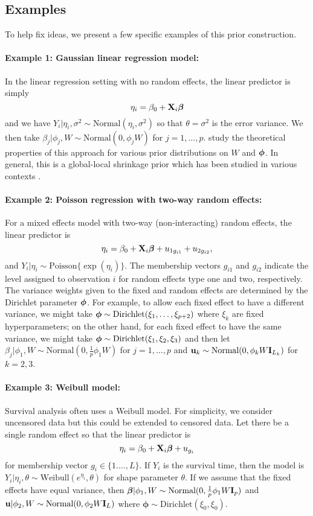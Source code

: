 \documentclass[12pt]{article}
\begin{document}
\subsection{Examples}\label{s:examples}
To help fix ideas, we present a few specific examples of this prior construction.

\paragraph{Example 1: Gaussian linear regression model:} In the linear regression setting with no random effects, the linear predictor is simply $$\eta_i=\beta_0+\mbox{\bf X}_i\mbox{\boldmath $\beta$}$$ and we have $Y_i|\eta_i,\sigma^2\sim\mbox{Normal}(\eta_i,\sigma^2)$ so that $\theta=\sigma^2$ is the error variance. We then take $\beta_j|\phi_j,W\sim\mbox{Normal}(0,\phi_j W)$ for $j=1,\dots,p$. \cite{zhang2022bayesian} study the theoretical properties of this approach for various prior distributions on $W$ and $\mbox{\boldmath $\phi$}$. In general, this is a global-local shrinkage prior which has been studied in various contexts \citep[e.g.,][]{carvalho2010, polson2012bb, Polson2012shrinkage, bhattacharya2015, zhang2018}.


\paragraph{Example 2: Poisson regression with two-way random effects:} For a mixed effects model with two-way (non-interacting) random effects, the linear predictor is $$\eta_{i}=\beta_0+\mbox{\bf X}_i\mbox{\boldmath $\beta$} + u_{1g_{i1}} + u_{2g_{i2}},$$ and $Y_i|\eta_i\sim\mbox{Poisson}\{\exp(\eta_i)\}$. The membership vectors $g_{i1}$ and $g_{i2}$ indicate the level assigned to observation $i$ for random effects type one and two, respectively. The variance weights given to the fixed and random effects are determined by the Dirichlet parameter $\mbox{\boldmath $\phi$}$. For example, to allow each fixed effect to have a different variance, we might take $\mbox{\boldmath $\phi$}\sim\mbox{Dirichlet}(\xi_1,\dots,\xi_{p+2})$ where $\xi_k$ are fixed hyperparameters; on the other hand, for each fixed effect to have the same variance, we might take $\mbox{\boldmath $\phi$}\sim\mbox{Dirichlet}(\xi_1,\xi_2,\xi_3)$ and then let $\beta_j|\phi_1,W\sim\mbox{Normal}(0,\tfrac1p\phi_1W)$ for $j=1,\dots,p$ and $\mbox{\bf u}_k\sim \mbox{Normal}(0, \phi_kW\mbox{\bf I}_{L_k})$ for $k=2,3$.






\paragraph{Example 3: Weibull model:} Survival analysis often uses a Weibull model. For simplicity, we consider uncensored data but this could be extended to censored data. Let there be a single random effect so that the linear predictor is
$$
    \eta_i = \beta_0 + \mbox{\bf X}_i\mbox{\boldmath $\beta$} + u_{g_i}
$$
for membership vector $g_i\in\{1.\dots,L\}$.
If $Y_i$ is the survival time, then the model is $Y_i|\eta_i,\theta\sim\mbox{Weibull}(e^{\eta_i},\theta)$ for shape parameter $\theta$. If we assume that the fixed effects have equal variance, then $\mbox{\boldmath $\beta$}|\phi_1,W\sim\mbox{Normal}(0,\tfrac1p\phi_1W\mbox{\bf I}_{p})$ and $\mbox{\bf u}|\phi_2,W\sim\mbox{Normal}(0,\phi_2W\mbox{\bf I}_{L})$ where $\boldsymbol\phi\sim\mbox{Dirichlet}(\xi_0,\xi_0)$.
\end{document}
